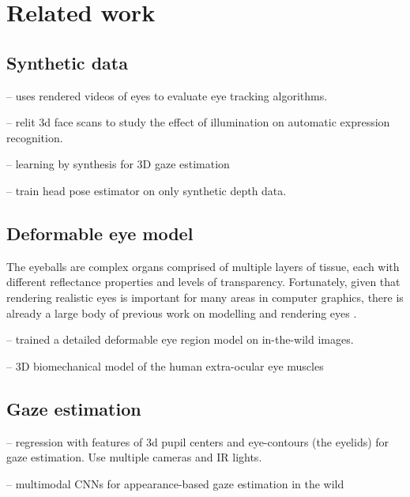 
\section{Related work}

\subsection{Synthetic data}

\cite{swirski2014rendering} -- uses rendered videos of eyes to evaluate eye tracking algorithms.

\cite{stratou2011effect} -- relit 3d face scans to study the effect of illumination on automatic expression recognition.

\cite{sugano2014learning} -- learning by synthesis for 3D gaze estimation

\cite{fanelli2011real} -- train head pose estimator on only synthetic depth data.

\subsection{Deformable eye model}

The eyeballs are complex organs comprised of multiple layers of tissue, each with different reflectance properties and levels of transparency.
Fortunately, given that rendering realistic eyes is important for many areas in computer graphics, there is already a large body of previous work on modelling and rendering eyes \cite{ruhland2014look}.

\cite{alabort2014statistically} -- trained a detailed deformable eye region model on in-the-wild images.

\cite{priamikov14_openeyesim} -- 3D biomechanical model of the human extra-ocular eye muscles

\subsection{Gaze estimation}

\cite{xiong2014gaze} -- regression with features of 3d pupil centers and eye-contours (the eyelids) for gaze estimation.  Use multiple cameras and IR lights.

\cite{zhang15_cvpr} -- multimodal CNNs for appearance-based gaze estimation in the wild


